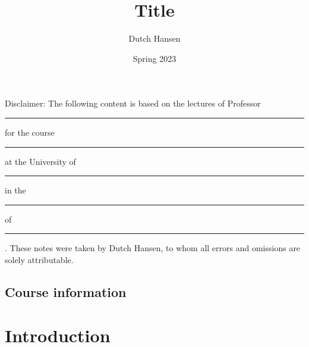 \documentclass[10pt]{scrartcl}
\title{Title}
\author{Dutch Hansen}
\date{Spring 2023}
\begin{document}
\maketitle

Disclaimer: The following content is based on the lectures of Professor \rule{1cm}{0.15mm} for the course \rule{1cm}{0.15mm} at the University of \rule{1cm}{0.15mm} in the \rule{1cm}{0.15mm} of \rule{1cm}{0.15mm}. These notes were taken by Dutch Hansen, to whom all errors and omissions are solely attributable.

\subsection*{Course information}


\pagebreak

\tableofcontents

\pagebreak

\section{Introduction}

\end{document}
